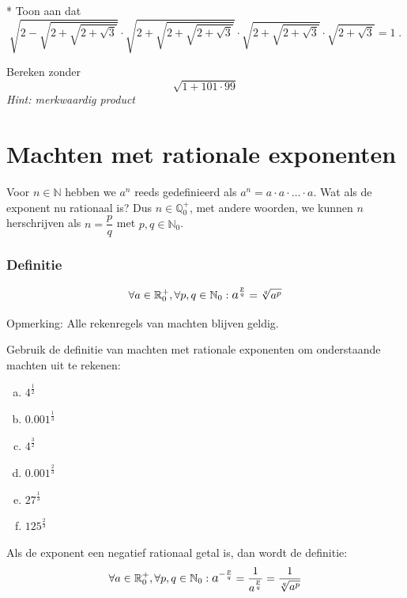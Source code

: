 \documentclass[12pt,twoside,a4paper]{article}
\begin{document}
\begin{oefening}*
Toon aan dat
$$\sqrt{2-\sqrt{2+\sqrt{2+\sqrt{3}}}}\cdot\sqrt{2+\sqrt{2+\sqrt{2+\sqrt{3}}}}\cdot\sqrt{2+\sqrt{2+\sqrt{3}}}\cdot\sqrt{2+\sqrt{3}} = 1\;.$$
\end{oefening}

\begin{oefening}
Bereken zonder 
$$\sqrt{1+101\cdot99}$$
{\em Hint: merkwaardig product}
\end{oefening}

\newpage
\section{Machten met rationale exponenten}

Voor $n\in\mathbb{N}$ hebben we $a^n$ reeds gedefinieerd als $a^n=a\cdot a\cdot \ldots \cdot a$. Wat als de exponent nu rationaal is? Dus $n\in\mathbb{Q}^+_0$, met andere woorden, we kunnen $n$ herschrijven als $n=\dfrac{p}{q}$ met $p,q\in\mathbb{N}_0$.

\subsubsection*{Definitie}
\begin{mdframed}
$$\forall a \in \mathbb{R}^+_0, \forall p,q\in  \mathbb{N}_0: \mathlarger a^{\frac{p}{q}}=\sqrt[q]{a^p}$$
\end{mdframed}

Opmerking: Alle rekenregels van machten blijven geldig.

\begin{oefening}
Gebruik de definitie van machten met rationale exponenten om onderstaande machten uit te rekenen:
\begin{multicols}{3}
\begin{enumerate}[(a)]
  \itemsep.5em
  \item $4^{\frac{1}{2}}$
  \item $0.001^{\frac{1}{3}}$
  \item $4^{\frac{3}{2}}$
  \item $0.001^{\frac{2}{3}}$
  \item $27^{\frac{1}{3}}$
  \item $125^{\frac{2}{3}}$
\end{enumerate}
\end{multicols}
\end{oefening}

Als de exponent een negatief rationaal getal is, dan wordt de definitie:
$$\forall a \in \mathbb{R}^+_0, \forall p,q\in  \mathbb{N}_0: \mathlarger a^{-\frac{p}{q}}=\dfrac{1}{a^{\frac{p}{q}}}=\dfrac{1}{\sqrt[q]{a^p}}$$
\end{document}
